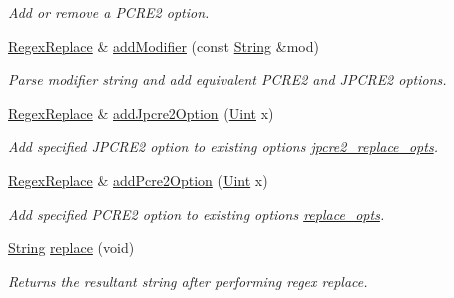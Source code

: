 \begin{DoxyCompactItemize}
\begin{DoxyCompactList}\small\item\em Add or remove a P\+C\+R\+E2 option. \end{DoxyCompactList}\item 
\hyperlink{classjpcre2_1_1RegexReplace}{Regex\+Replace} \& \hyperlink{classjpcre2_1_1RegexReplace_a06a57430f62058822d48722a2a6425d7_a06a57430f62058822d48722a2a6425d7}{add\+Modifier} (const \hyperlink{namespacejpcre2_a91f03070152fb228bc116c5a737f1d16}{String} \&mod)
\begin{DoxyCompactList}\small\item\em Parse modifier string and add equivalent P\+C\+R\+E2 and J\+P\+C\+R\+E2 options. \end{DoxyCompactList}\item 
\hyperlink{classjpcre2_1_1RegexReplace}{Regex\+Replace} \& \hyperlink{classjpcre2_1_1RegexReplace_a3f86b1e11d08d0153a08244771e59061_a3f86b1e11d08d0153a08244771e59061}{add\+Jpcre2\+Option} (\hyperlink{namespacejpcre2_a078242d38221a13fb3543b9edd78c099}{Uint} x)
\begin{DoxyCompactList}\small\item\em Add specified J\+P\+C\+R\+E2 option to existing options \hyperlink{classjpcre2_1_1RegexReplace_acf13bcb16918df4b7bcaa7e49a1c7d59}{jpcre2\+\_\+replace\+\_\+opts}. \end{DoxyCompactList}\item 
\hyperlink{classjpcre2_1_1RegexReplace}{Regex\+Replace} \& \hyperlink{classjpcre2_1_1RegexReplace_a3cfd03568b23bebcbb530a2c120b5d33_a3cfd03568b23bebcbb530a2c120b5d33}{add\+Pcre2\+Option} (\hyperlink{namespacejpcre2_a078242d38221a13fb3543b9edd78c099}{Uint} x)
\begin{DoxyCompactList}\small\item\em Add specified P\+C\+R\+E2 option to existing options \hyperlink{classjpcre2_1_1RegexReplace_afc79699cfcad8b7cbb26864b6b67cdc7}{replace\+\_\+opts}. \end{DoxyCompactList}\item 
\hyperlink{namespacejpcre2_a91f03070152fb228bc116c5a737f1d16}{String} \hyperlink{classjpcre2_1_1RegexReplace_afd087fa7a9bfedec802d1a3dd7edbdd0_afd087fa7a9bfedec802d1a3dd7edbdd0}{replace} (void)
\begin{DoxyCompactList}\small\item\em Returns the resultant string after performing regex replace. \end{DoxyCompactList}\end{DoxyCompactItemize}
